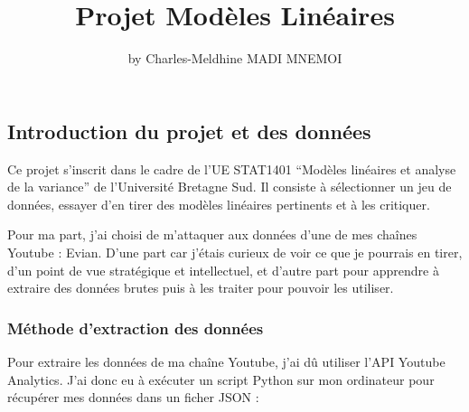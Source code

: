 \title{Projet Modèles Linéaires}
\author{by Charles-Meldhine MADI MNEMOI}

\maketitle


\hypertarget{introduction-du-projet-et-des-donnuxe9es}{%
\subsection{Introduction du projet et des
données}\label{introduction-du-projet-et-des-donnuxe9es}}

Ce projet s'inscrit dans le cadre de l'UE STAT1401 ``Modèles linéaires
et analyse de la variance'' de l'Université Bretagne Sud. Il consiste à
sélectionner un jeu de données, essayer d'en tirer des modèles linéaires
pertinents et à les critiquer.

Pour ma part, j'ai choisi de m'attaquer aux données d'une de mes chaînes
Youtube : Evian. D'une part car j'étais curieux de voir ce que je
pourrais en tirer, d'un point de vue stratégique et intellectuel, et
d'autre part pour apprendre à extraire des données brutes puis à les
traiter pour pouvoir les utiliser.

\hypertarget{muxe9thode-dextraction-des-donnuxe9es}{%
\subsubsection{Méthode d'extraction des
données}\label{muxe9thode-dextraction-des-donnuxe9es}}

Pour extraire les données de ma chaîne Youtube, j'ai dû utiliser l'API
Youtube Analytics. J'ai donc eu à exécuter un script Python sur mon
ordinateur pour récupérer mes données dans un ficher JSON :

